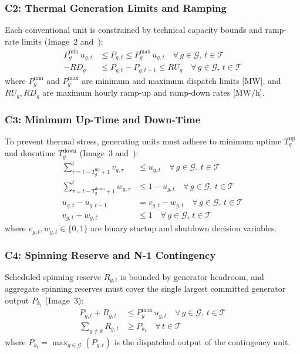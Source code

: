 \documentclass[journal]{IEEEtran}
\begin{document}
\subsubsection{C2: Thermal Generation Limits and Ramping}
Each conventional unit is constrained by technical capacity bounds and ramp-rate limits (Image~2 and~\cite{E02Sulawesi}):
\begin{align}
  P_g^{\min}\,u_{g,t} &\leq P_{g,t} \leq P_g^{\max}\,u_{g,t} \quad \forall\,g \in \mathcal{G},\,t \in \mathcal{T}
  \label{eq:gen_limit} \\
  -RD_g &\leq P_{g,t} - P_{g,t-1} \leq RU_g \quad \forall\,g \in \mathcal{G},\,t \in \mathcal{T}
  \label{eq:ramp_limit}
\end{align}
where $P_g^{\min}$ and $P_g^{\max}$ are minimum and maximum dispatch limits [MW], and $RU_g, RD_g$ are maximum hourly ramp-up and ramp-down rates [MW/h].

\subsubsection{C3: Minimum Up-Time and Down-Time}
To prevent thermal stress, generating units must adhere to minimum uptime $T_g^{\text{up}}$ and downtime $T_g^{\text{down}}$ (Image~3 and~\cite{E02Sulawesi}):
\begin{align}
  \sum_{\tau=t-T_g^{\text{up}}+1}^{t} v_{g,\tau} &\leq u_{g,t} \quad \forall\,g \in \mathcal{G},\,t \in \mathcal{T}
  \label{eq:min_uptime} \\
  \sum_{\tau=t-T_g^{\text{down}}+1}^{t} w_{g,\tau} &\leq 1 - u_{g,t} \quad \forall\,g \in \mathcal{G},\,t \in \mathcal{T}
  \label{eq:min_downtime} \\
  u_{g,t} - u_{g,t-1} &= v_{g,t} - w_{g,t} \quad \forall\,g \in \mathcal{G},\,t \in \mathcal{T}
  \label{eq:status_logic} \\
  v_{g,t} + w_{g,t} &\leq 1 \quad \forall\,g \in \mathcal{G},\,t \in \mathcal{T}
  \label{eq:no_sim_su_sd}
\end{align}
where $v_{g,t}, w_{g,t} \in \{0, 1\}$ are binary startup and shutdown decision variables.

\subsubsection{C4: Spinning Reserve and N-1 Contingency}
Scheduled spinning reserve $R_{g,t}$ is bounded by generator headroom, and aggregate spinning reserves must cover the single largest committed generator output $P_{k_t}$ (Image~3):
\begin{align}
  P_{g,t} + R_{g,t} &\leq P_g^{\max}\,u_{g,t} \quad \forall\,g \in \mathcal{G},\,t \in \mathcal{T}
  \label{eq:reserve_headroom} \\
  \sum_{g \neq k} R_{g,t} &\geq P_{k_t} \quad \forall\,t \in \mathcal{T}
  \label{eq:n1_reserve}
\end{align}
where $P_{k_t} = \max_{g \in \mathcal{G}} (P_{g,t})$ is the dispatched output of the contingency unit.
\end{document}
